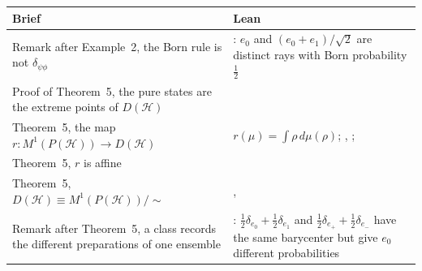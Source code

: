 \documentclass[11pt]{article}
\begin{document}
\begin{center}
\begin{tabularx}{\textwidth}{@{}BL@{}}
\toprule
Brief & Lean \\
\midrule
Remark after Example~2, the Born rule is not $\delta_{\psi\phi}$ & : $e_0$ and
  $(e_0 + e_1)/\sqrt2$ are distinct rays with Born probability $\frac12$ \\
Proof of Theorem~5, the pure states are the extreme points of $D(\mathcal H)$ &
   \\
Theorem~5, the map $r : M^1(P(\mathcal H)) \to D(\mathcal H)$ & 
  $r(\mu) = \int \rho\,d\mu(\rho)$; ,
  ;  \\
Theorem~5, $r$ is affine &  \\
Theorem~5, $D(\mathcal H) \equiv M^1(P(\mathcal H))/{\sim}$ & ,
   \\
Remark after Theorem~5, a class records the different preparations of one ensemble &
  : $\frac12\delta_{e_0} + \frac12\delta_{e_1}$ and
  $\frac12\delta_{e_+} + \frac12\delta_{e_-}$ have the same barycenter but give $e_0$ different
  probabilities \\
\bottomrule
\end{tabularx}
\end{center}
\end{document}
